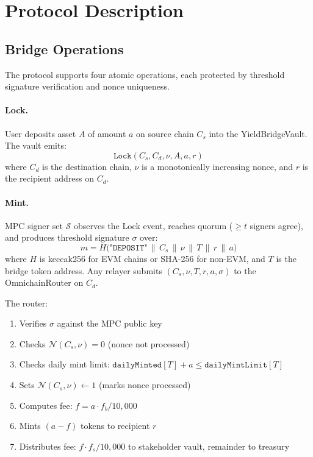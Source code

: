 \documentclass[11pt]{article}
\begin{document}
\section{Protocol Description}
\label{sec:protocol}

\subsection{Bridge Operations}

The protocol supports four atomic operations, each protected by threshold signature verification and nonce uniqueness.

\paragraph{Lock.} User deposits asset $A$ of amount $a$ on source chain $C_s$ into the YieldBridgeVault. The vault emits:
\[
  \texttt{Lock}(C_s, C_d, \nu, A, a, r)
\]
where $C_d$ is the destination chain, $\nu$ is a monotonically increasing nonce, and $r$ is the recipient address on $C_d$.

\paragraph{Mint.} MPC signer set $\mathcal{S}$ observes the Lock event, reaches quorum ($\geq t$ signers agree), and produces threshold signature $\sigma$ over:
\begin{equation}
  \label{eq:deposit-msg}
  m = H\bigl(\texttt{"DEPOSIT"} \,\|\, C_s \,\|\, \nu \,\|\, T \,\|\, r \,\|\, a\bigr)
\end{equation}
where $H$ is keccak256 for EVM chains or SHA-256 for non-EVM, and $T$ is the bridge token address. Any relayer submits $(C_s, \nu, T, r, a, \sigma)$ to the OmnichainRouter on $C_d$.

The router:
\begin{enumerate}[nosep]
  \item Verifies $\sigma$ against the MPC public key
  \item Checks $\mathcal{N}(C_s, \nu) = 0$ (nonce not processed)
  \item Checks daily mint limit: $\texttt{dailyMinted}[T] + a \leq \texttt{dailyMintLimit}[T]$
  \item Sets $\mathcal{N}(C_s, \nu) \leftarrow 1$ (marks nonce processed)
  \item Computes fee: $f = a \cdot f_b / 10{,}000$
  \item Mints $(a - f)$ tokens to recipient $r$
  \item Distributes fee: $f \cdot f_s / 10{,}000$ to stakeholder vault, remainder to treasury
\end{enumerate}
\end{document}
